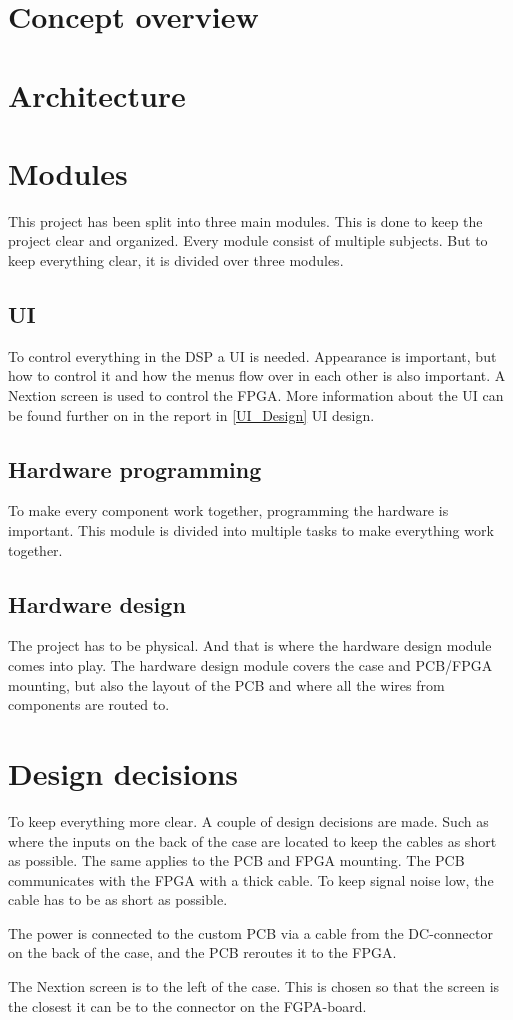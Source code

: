 \section{Concept overview}


\section{Architecture} \label{Architecture}


\section{Modules}

This project has been split into three main modules. This is done to keep the project clear and organized. Every module consist of multiple subjects. But to keep everything clear, it is divided over three modules.

\subsection{UI}
To control everything in the DSP a UI is needed. Appearance is important, but how to control it and how the menus flow over in each other is also important. A Nextion screen is used to control the FPGA. More information about the UI can be found further on in the report in \ref{UI_Design} UI design.

\subsection{Hardware programming}
To make every component work together, programming the hardware is important. This module is divided into multiple tasks to make everything work together.

\subsection{Hardware design}
The project has to be physical. And that is where the hardware design module comes into play. The hardware design module covers the case and PCB/FPGA mounting, but also the layout of the PCB and where all the wires from components are routed to.

\section{Design decisions}
To keep everything more clear. A couple of design decisions are made. Such as where the inputs on the back of the case are located to keep the cables as short as possible. The same applies to the PCB and FPGA mounting. The PCB communicates with the FPGA with a thick cable. To keep signal noise low, the cable has to be as short as possible. 
\par
\noindent The power is connected to the custom PCB via a cable from the DC-connector on the back of the case, and the PCB reroutes it to the FPGA.
\par
\noindent The Nextion screen is to the left of the case. This is chosen so that the screen is the closest it can be to the connector on the FGPA-board. 

